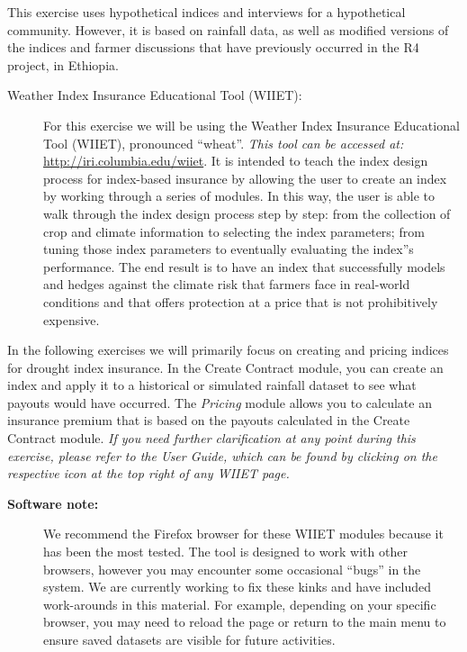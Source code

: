 \documentclass[letterpaper,10pt,english]{sphinxmanual}
\begin{document}
This exercise uses hypothetical indices and interviews for a hypothetical community. However, it is based on rainfall data, as well as modified versions of the indices and farmer discussions that have previously occurred in the R4 project, in Ethiopia.
\begin{description}
\item[{Weather Index Insurance Educational Tool (WIIET):}] \leavevmode
For this exercise we will be using the Weather Index Insurance Educational Tool (WIIET), pronounced ``wheat''. \emph{This tool can be accessed at:} \href{http://iri.columbia.edu/wiiet}{http://iri.columbia.edu/wiiet}. It is intended to teach the index design process for index-based insurance by allowing the user to create an index by working through a series of modules. In this way, the user is able to walk through the index design process step by step: from the collection of crop and climate information to selecting the index parameters; from tuning those index parameters to eventually evaluating the index''s performance. The end result is to have an index that successfully models and hedges against the climate risk that farmers face in real-world conditions and that offers protection at a price that is not prohibitively expensive.

\end{description}

In the following exercises we will primarily focus on creating and pricing indices for drought index insurance. In the Create Contract module, you can create an index and apply it to a historical or simulated rainfall dataset to see what payouts would have occurred. The \emph{Pricing} module allows you to calculate an insurance premium that is based on the payouts calculated in the Create Contract module. \emph{If you need further clarification at any point during this exercise, please refer to the User Guide, which can be found by clicking on the respective icon at the top right of any WIIET page.}
\begin{description}
\item[{\textbf{Software note:}}] \leavevmode
We recommend the Firefox browser for these WIIET modules because it has been the most tested. The tool is designed to work with other browsers, however you may encounter some occasional ``bugs'' in the system. We are currently working to fix these kinks and have included work-arounds in this material. For example, depending on your specific browser, you may need to reload the page or return to the main menu to ensure saved datasets are visible for future activities.

\end{description}
\end{document}
